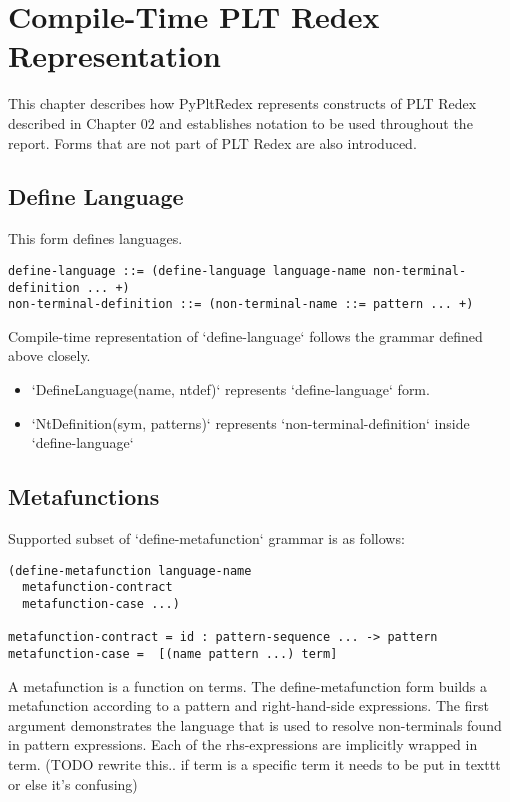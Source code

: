 \chapter{Compile-Time PLT Redex Representation}

This chapter describes how PyPltRedex represents constructs of PLT Redex described in Chapter 02 and establishes notation to be used throughout the report. Forms that are not part of PLT Redex are also introduced.

\section{Define Language}

This form defines languages.

\begin{lstlisting}
define-language ::= (define-language language-name non-terminal-definition ... +)
non-terminal-definition ::= (non-terminal-name ::= pattern ... +)
\end{lstlisting}

Compile-time representation of `define-language` follows the grammar defined above closely. 

\begin{itemize}
\item
`DefineLanguage(name, ntdef)` represents `define-language` form. 
\item
`NtDefinition(sym, patterns)` represents `non-terminal-definition` inside `define-language`
\end{itemize}

\section{Metafunctions}
Supported subset of `define-metafunction` grammar is as follows:

\begin{lstlisting}
(define-metafunction language-name
  metafunction-contract
  metafunction-case ...)

metafunction-contract =	id : pattern-sequence ... -> pattern 
metafunction-case =  [(name pattern ...) term] 
\end{lstlisting}

A metafunction is a function on terms. The define-metafunction form builds a metafunction according to a pattern and right-hand-side expressions. The first argument demonstrates the language that is used to resolve non-terminals found in pattern expressions. Each of the rhs-expressions are implicitly wrapped in term. (TODO rewrite this.. if term is a specific term it needs to be put in texttt or else it's confusing)

